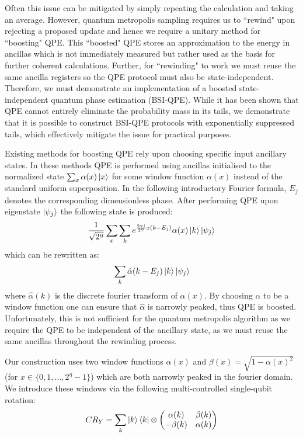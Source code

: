 \documentclass[aps,floatfix,10pt,amssymb,amsfont,amsmath,superscriptaddress,float,nofootinbib,longbibliography,nobalancelastpage,twocolumn]{revtex4-2}
\begin{document}
Often this issue can be mitigated by simply repeating the calculation and taking an average. However, quantum metropolis sampling requires us to ``rewind" upon rejecting a proposed update and hence we require a unitary method for ``boosting" QPE. This ``boosted" QPE stores an approximation to the energy in ancillas which is not immediately measured but rather used as the basis for further coherent calculations. Further, for ``rewinding" to work we must reuse the same ancilla registers so the QPE protocol must also be state-independent. Therefore, we must demonstrate an implementation of a boosted state-independent quantum phase estimation (BSI-QPE). While it has been shown \cite{chen2023quantumthermalstatepreparation} that QPE cannot entirely eliminate the probability mass in its tails, we demonstrate that it is possible to construct BSI-QPE protocols with exponentially suppressed tails, which effectively mitigate the issue for practical purposes. 

Existing methods for boosting QPE rely upon choosing specific input ancillary states. In these methods QPE is performed using ancillas initialised to the normalized state $\sum_x \alpha(x) \ket{x}$ for some window function $\alpha(x)$ instead of the standard uniform superposition. In the following introductory Fourier formula, $E_j$ denotes the corresponding dimensionless phase. After performing QPE upon eigenstate $\ket{\psi_j}$ the following state is produced:
\begin{equation}
   \frac{1}{\sqrt{2^{\eta}}} \sum_x \sum_k e^{\frac{2 \pi i}{2^{\eta}}x(k-E_j)} \alpha(x)\ket{k}\ket{\psi_j}
\end{equation}
which can be rewritten as:
\begin{equation}
    \sum_k \hat\alpha(k-E_j) \ket{k}\ket{\psi_j}
\end{equation}
where $\hat \alpha(k)$ is the discrete fourier transform of $\alpha(x)$. By choosing $\alpha$ to be a window function one can ensure that $\hat \alpha$ is narrowly peaked, thus QPE is boosted. Unfortunately, this is not sufficient for the quantum metropolis algorithm as we require the QPE to be independent of the ancillary state, as we must reuse the same ancillas throughout the rewinding process. 

Our construction uses two window functions $\alpha(x)$ and $\beta(x) = \sqrt{1-\alpha(x)^2}$ (for $x\in\{0,1,\ldots,2^{\eta}-1\}$) which are both narrowly peaked in the fourier domain. We introduce these windows via the following multi-controlled single-qubit rotation:
\begin{equation}
   CR_Y = \sum_k \ket{k}\bra{k}\otimes \begin{pmatrix}
        \alpha(k)& \beta(k)\\
        -\beta(k)& \alpha(k)
    \end{pmatrix}
\end{equation}
\end{document}
